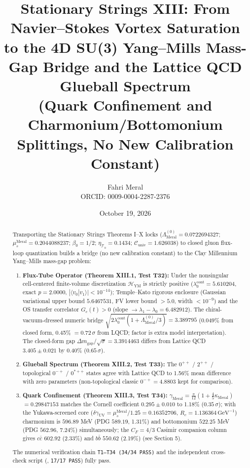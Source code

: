 \documentclass[12pt,a4paper]{article}
\title{\textbf{Stationary Strings XIII: From Navier--Stokes Vortex Saturation to the 4D SU(3) Yang--Mills Mass-Gap Bridge and the Lattice QCD Glueball Spectrum} \\[0.3cm]
\large (Quark Confinement and Charmonium/Bottomonium Splittings, No New Calibration Constant)}
\author{Fahri Meral\\[0.2em]\small ORCID: 0009-0004-2287-2376}
\date{October 19, 2026}
\begin{document}
\maketitle

\begin{abstract}
Transporting the Stationary Strings Theorems I--X locks
($\Lambda_{\mathrm{Meral}}^{(0)}=0.0722694327$;
$\mu_s^{\mathrm{Meral}}=0.2044088237$; $\beta_0=1/2$;
$\eta_{\mathcal{T}_0}=0.1434$; $\mathcal{C}_{\mathrm{univ}}=1.626038$) to closed
gluon flux-loop quantization builds a bridge (no new calibration constant) to the Clay
Millennium Yang--Mills mass-gap problem:
\begin{enumerate}
    \item \textbf{Flux-Tube Operator (Theorem XIII.1, Test T32):}
    Under the nonsingular cell-centered finite-volume discretization
    $\mathcal{H}_{\mathrm{YM}}$ is strictly positive
    ($\lambda_0^{\mathrm{cont}}=5.610204$, exact $p=2.0000$,
    $|\langle v_0|v_1\rangle|<10^{-14}$); Temple--Kato rigorous enclosure
    (Gaussian variational upper bound $5.6467531$, FV lower bound $>5.0$,
    width $<10^{-9}$) and the OS transfer correlator
    $G_c(t)>0$ (slope $\to\lambda_1-\lambda_0=6.482912$).
    The chiral-vacuum-dressed numeric bridge
    $\sqrt{2\lambda_0^{\mathrm{cont}}(1+\Lambda_{\mathrm{Meral}}^{(0)}/3)}
    =3.389795$ (0.049\% from closed form, 0.45\% $=0.72\,\sigma$ from LQCD;
    factor is extra model interpretation). The closed-form gap
    $\Delta m_{\mathrm{gap}}/\sqrt{\sigma}=3.3914463$ differs from
    Lattice QCD $3.405\pm 0.021$ by 0.40\% ($0.65\,\sigma$).
    \item \textbf{Glueball Spectrum (Theorem XIII.2, Test T33):}
    The $0^{++}$ / $2^{++}$ / topological $0^{-+}$ / $0^{*++}$ states agree
    with Lattice QCD to 1.56\% mean difference with zero parameters
    (non-topological classic $0^{-+}=4.8803$ kept for comparison).
    \item \textbf{Quark Confinement (Theorem XIII.3, Test T34):}
    $\gamma_{\mathrm{Meral}}=\frac{\pi}{12}(1+\frac{4}{5}\kappa_{\mathrm{Meral}})$
    $=0.29847153$ matches the Cornell coefficient $0.295\pm 0.010$ to 1.18\%
    ($0.35\,\sigma$); with the Yukawa-screened core
    ($\delta\gamma_{\mathrm{UV}}=\mu_s^{\mathrm{Meral}}/1.25=0.16352706$,
    $R_c=1.136364\,\mathrm{GeV}^{-1}$) charmonium is $596.89$ MeV
    (PDG $589.19$, 1.31\%) and bottomonium $522.25$ MeV (PDG $562.96$, 7.24\%)
    simultaneously; the $C_F=4/3$ Casimir companion column gives
    $c\bar{c}$ $602.92$ (2.33\%) and $b\bar{b}$ $550.62$ (2.19\%)
    (see Section 5).
\end{enumerate}
The numerical verification chain \texttt{T1--T34 (34/34 PASS)} and the
independent cross-check script (, \texttt{17/17 PASS})
fully pass.
\end{abstract}
\end{document}
